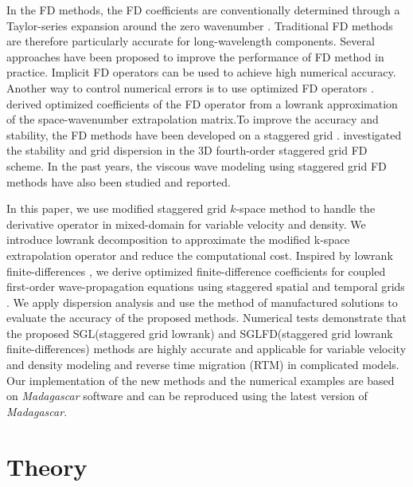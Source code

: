 In the FD methods, the FD coefficients are conventionally determined through a Taylor-series expansion around the zero wavenumber \cite[]{dablain,kindelan}. Traditional FD methods are therefore particularly accurate for long-wavelength components. Several approaches have been proposed to improve the performance of FD method in practice. Implicit FD operators \cite[]{liuimp,chu12} can be used to achieve high numerical accuracy. Another way to control numerical errors is to use optimized FD operators \cite[]{geller2,chu09,liuomp}. \cite{songlfd} derived optimized coefficients of the FD operator from a lowrank approximation \cite[]{fomellowrankgp} of the space-wavenumber extrapolation matrix.To improve the accuracy and stability, the FD methods have been developed on a staggered grid \cite[]{madariaga,virieux1984,virieux1986,levander}. \cite{moczo} investigated the stability and grid dispersion in the 3D fourth-order staggered grid FD scheme. In the past years, the viscous wave modeling using staggered grid FD methods \cite[]{robertsson,bohlen,operto}have also been studied and reported.

In this paper, we use modified staggered grid $k$-space method \cite[]{tabei,songffd} to handle the derivative operator in mixed-domain for variable velocity and density. We introduce lowrank decomposition \cite[]{fomellowrankgp} to approximate the modified k-space extrapolation operator and reduce the computational cost. Inspired by lowrank finite-differences \cite[]{songlfd}, we derive optimized finite-difference coefficients for coupled first-order wave-propagation equations using staggered spatial and temporal grids \cite[]{virieux1984,virieux1986,levander}. We apply dispersion analysis and use the method of manufactured solutions to evaluate the accuracy of the proposed methods. Numerical tests demonstrate that the proposed SGL(staggered grid lowrank) and SGLFD(staggered grid lowrank finite-differences) methods are highly accurate and applicable for variable velocity and density modeling and reverse time migration (RTM) in complicated models. Our implementation of the new methods and the numerical examples are based on \emph{Madagascar} software \cite[]{m8r} and can be reproduced using the latest version of \emph{Madagascar}.

\section{Theory}


